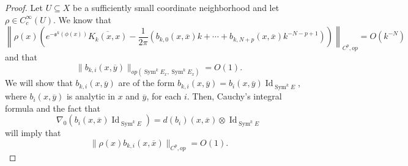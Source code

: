\documentclass[10pt,a4paper]{amsart}
\DeclareMathOperator{\Id}{Id}
\DeclareMathOperator{\Sym}{Sym}
\begin{document}
\begin{proof}

Let $U \subseteq X$ be a sufficiently small coordinate neighborhood and let $\rho \in C_c^\infty(U)$. We know that
\begin{equation*}
\left \|\rho(x) \left ( e^{-\mathfrak{s}^k(\phi(x))} \overline{K_k(x,x)} - \frac{1}{2\pi} \left ( b_{k,0}(x,\overline{x})k + \dotsb + b_{k,N+p}(x,\overline{x}) k^{-N-p+1} \right) \right) \right \|_{C^p,op} = O(k^{-N})
\end{equation*}
and that
\begin{equation*}
    \|b_{k,i}(x,\overline{y})\|_{op(\Sym^k E_x,\Sym^k E_x)} = O(1).
\end{equation*}
We will show that $b_{k,i}(x,\overline{y})$ are of the form $b_{k,i}(x,\overline{y}) = b_i(x,\overline{y}) \Id_{\Sym^k E}$, where $b_i(x,\overline{y})$ is analytic in $x$ and $\overline{y}$, for each $i$. Then, Cauchy's integral formula and the fact that 
\begin{equation*}
    \nabla_0 (b_i(x,\overline{x}) \Id_{\Sym^k E}) = d (b_i)(x,\overline{x}) \otimes \Id_{\Sym^k E}
\end{equation*}
will imply that
\begin{equation*}
    \|\rho(x)b_{k,i}(x,\overline{x})\|_{C^p,op} = O(1).
\end{equation*}



\end{proof}
\end{document}
